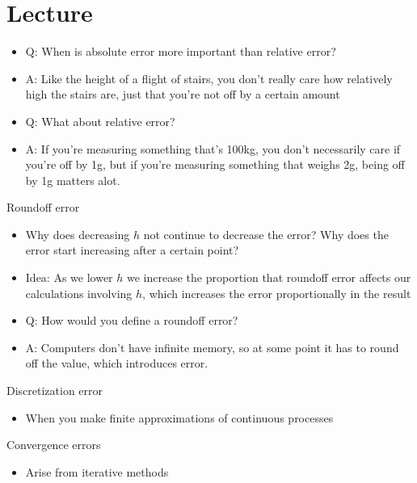 \documentclass{article}
\begin{document}
\section{Lecture}
\begin{itemize}
	\item Q: When is absolute error more important than relative error?
	\item A: Like the height of a flight of stairs, you don't really care how relatively high the stairs are, just that you're not off by a certain amount
\end{itemize}
\begin{itemize}
	\item Q: What about relative error?
	\item A: If you're measuring something that's 100kg, you don't necessarily care if you're off by 1g, but if you're measuring something that weighs 2g, being off by 1g matters alot.
\end{itemize}
Roundoff error
\begin{itemize}
	\item Why does decreasing $h$ not continue to decrease the error? Why does the error start increasing after a certain point?
	\item Idea: As we lower $h$ we increase the proportion that roundoff error affects our calculations involving $h$, which increases the error proportionally in the result
	\item Q: How would you define a roundoff error?
	\item A: Computers don't have infinite memory, so at some point it has to round off the value, which introduces error.
\end{itemize}
Discretization error
\begin{itemize}
	\item When you make finite approximations of continuous processes
\end{itemize}
Convergence errors
\begin{itemize}
	\item Arise from iterative methods
\end{itemize}
\end{document}
